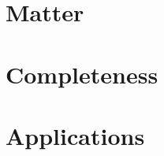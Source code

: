 \documentclass[12pt]{article}
\theoremstyle{remark}
\theoremstyle{definition}
\begin{document}






\part{Matter}







\part{Completeness}







\part{Applications}








\end{document}
